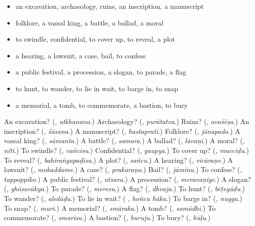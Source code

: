 \begin{itemize}
\raggedright
  \item an excavation, archaeology, ruins, an inscription, a manuscript
  \item folklore, a vassal king, a battle, a ballad, a moral
  \item to swindle, confidential, to cover up, to reveal, a plot
  \item a hearing, a lawsuit, a case, bail, to confess
  \item a public festival, a procession, a slogan, to parade, a flag
  \item to hunt, to wander, to lie in wait, to barge in, to snap
  \item a memorial, a tomb, to commemorate, a bastion, to bury
\end{itemize}

\begin{tcolorbox}[breakable,colback=teal!4,colframe=teal!35!black,title={Before you move on}]
An excavation? (\textbf{}, \emph{utkhanana}.) Archaeology? (\textbf{}, \emph{purātatva}.) Ruins? (\textbf{}, \emph{avaśēṣa}.) An inscription? (\textbf{}, \emph{śāsana}.) A manuscript? (\textbf{}, \emph{hastaprati}.) Folklore? (\textbf{}, \emph{jānapada}.) A vassal king? (\textbf{}, \emph{sāmanta}.) A battle? (\textbf{}, \emph{samara}.) A ballad? (\textbf{}, \emph{lāvaṇi}.) A moral? (\textbf{}, \emph{nīti}.) To swindle? (\textbf{}, \emph{vañcisu}.) Confidential? (\textbf{}, \emph{gaupya}.) To cover up? (\textbf{}, \emph{mucciḍu}.) To reveal? (\textbf{}, \emph{bahiraṅgapaḍisu}.) A plot? (\textbf{}, \emph{sañcu}.) A hearing? (\textbf{}, \emph{vicāraṇe}.) A lawsuit? (\textbf{}, \emph{mokaddame}.) A case? (\textbf{}, \emph{prakaraṇa}.) Bail? (\textbf{}, \emph{jāmīnu}.) To confess? (\textbf{}, \emph{tappoppiko}.) A public festival? (\textbf{}, \emph{utsava}.) A procession? (\textbf{}, \emph{meravaṇige}.) A slogan? (\textbf{}, \emph{ghōṣavākya}.) To parade? (\textbf{}, \emph{meresu}.) A flag? (\textbf{}, \emph{dhvaja}.) To hunt? (\textbf{}, \emph{bēṭeyāḍu}.) To wander? (\textbf{}, \emph{aledāḍu}.) To lie in wait? (\textbf{ }, \emph{hoñcu hāku}.) To barge in? (\textbf{}, \emph{nuggu}.) To snap? (\textbf{}, \emph{muri}.) A memorial? (\textbf{}, \emph{smāraka}.) A tomb? (\textbf{}, \emph{samādhi}.) To commemorate? (\textbf{}, \emph{smarisu}.) A bastion? (\textbf{}, \emph{buruju}.) To bury? (\textbf{}, \emph{hūḷu}.)
\end{tcolorbox}
